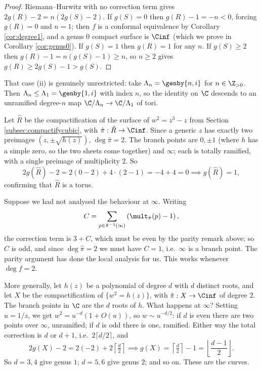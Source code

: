 \begin{proof}
	Riemann--Hurwitz with no correction term gives $2g(R)-2 = n(2g(S)-2)$. If $g(S)=0$ then
	$g(R) - 1 = -n < 0$, forcing $g(R) = 0$ and $n = 1$; then $f$ is a conformal equivalence
	by Corollary \ref{cor:degree1}, and a genus $0$ compact surface is $\Cinf$ (which we
	prove in Corollary \ref{cor:genus0}). If $g(S)=1$ then $g(R)=1$ for any $n$. If
	$g(S)\geq 2$ then $g(R) - 1 = n(g(S)-1) \geq n$, so $n \geq 2$ gives
	$g(R) \geq 2g(S)-1 > g(S)$.
\end{proof}

\begin{example}
	That case (ii) is genuinely unrestricted: take $\Lambda_n = \genby{n, i}$ for
	$n \in \Z_{>0}$. Then $\Lambda_n \leq \Lambda_1 = \genby{1,i}$ with index $n$, so the
	identity on $\C$ descends to an unramified degree-$n$ map $\C/\Lambda_n \to \C/\Lambda_1$
	of tori.
\end{example}

\begin{example}\label{rs-ex:cubicgenus}
	Let $\hat R$ be the compactification of the surface of $w^2 = z^3-z$ from Section
	\ref{subsec:compactifycubic}, with $\hat\pi : \hat R \to \Cinf$. Since a generic $z$
	has exactly two preimages $(z,\pm\sqrt{h(z)})$, $\deg\hat\pi = 2$. The branch points are
	$0, \pm 1$ (where $h$ has a simple zero, so the two sheets come together) and $\infty$;
	each is totally ramified, with a single preimage of multiplicity $2$. So
	$$
	2g(\hat R) - 2 = 2(0 - 2) + 4\cdot(2-1) = -4 + 4 = 0 \implies g(\hat R) = 1,
	$$
	confirming that $\hat R$ is a torus.
\end{example}

\begin{remark}
	Suppose we had not analysed the behaviour at $\infty$. Writing
	$$
	C = \sum_{p \in \hat\pi^{-1}(\infty)}\left(\mult_{\hat\pi}(p)-1\right),
	$$
	the correction term is
	$3 + C$, which must be even by the parity remark above; so $C$ is odd, and since
	$\deg\hat\pi = 2$ we must have $C = 1$, i.e.\ $\infty$ is a branch point. The parity
	argument has done the local analysis for us. This works whenever $\deg f = 2$.
\end{remark}

\begin{example}
	More generally, let $h(z)$ be a polynomial of degree $d$ with $d$ distinct roots, and
	let $X$ be the compactification of $\{w^2 = h(z)\}$, with $\hat\pi : X \to \Cinf$ of
	degree $2$. The branch points in $\C$ are the $d$ roots of $h$. What happens at
	$\infty$? Setting $u = 1/z$, we get $w^2 = u^{-d}(1 + O(u))$, so $w \sim u^{-d/2}$: if
	$d$ is even there are two points over $\infty$, unramified; if $d$ is odd there is one,
	ramified. Either way the total correction is $d$ or $d+1$, i.e.\ $2\lceil d/2\rceil$,
	and
	$$
	2g(X) - 2 = 2(-2) + 2\left\lceil \tfrac d2\right\rceil \implies g(X) = \left\lceil \tfrac d2\right\rceil - 1 = \left\lfloor \frac{d-1}{2}\right\rfloor.
	$$
	So $d = 3, 4$ give genus $1$; $d = 5,6$ give genus $2$; and so on. These are the
	 curves.
\end{example}

